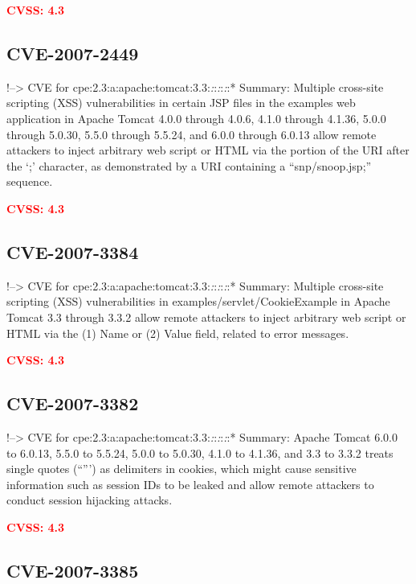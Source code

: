 \documentclass[a4paper, 12pt]{article}
\begin{document}
\textbf{\textcolor{red}{CVSS: 4.3}}

\hypertarget{cve-2007-2449}{%
\subsection{CVE-2007-2449}\label{cve-2007-2449}}

!--\textgreater{} CVE for
cpe:2.3:a:apache:tomcat:3.3:\emph{:}:\emph{:}:\emph{:}:* Summary:
Multiple cross-site scripting (XSS) vulnerabilities in certain JSP files
in the examples web application in Apache Tomcat 4.0.0 through 4.0.6,
4.1.0 through 4.1.36, 5.0.0 through 5.0.30, 5.5.0 through 5.5.24, and
6.0.0 through 6.0.13 allow remote attackers to inject arbitrary web
script or HTML via the portion of the URI after the `;' character, as
demonstrated by a URI containing a ``snp/snoop.jsp;'' sequence.

\textbf{\textcolor{red}{CVSS: 4.3}}

\hypertarget{cve-2007-3384}{%
\subsection{CVE-2007-3384}\label{cve-2007-3384}}

!--\textgreater{} CVE for
cpe:2.3:a:apache:tomcat:3.3:\emph{:}:\emph{:}:\emph{:}:* Summary:
Multiple cross-site scripting (XSS) vulnerabilities in
examples/servlet/CookieExample in Apache Tomcat 3.3 through 3.3.2 allow
remote attackers to inject arbitrary web script or HTML via the (1) Name
or (2) Value field, related to error messages.

\textbf{\textcolor{red}{CVSS: 4.3}}

\hypertarget{cve-2007-3382}{%
\subsection{CVE-2007-3382}\label{cve-2007-3382}}

!--\textgreater{} CVE for
cpe:2.3:a:apache:tomcat:3.3:\emph{:}:\emph{:}:\emph{:}:* Summary: Apache
Tomcat 6.0.0 to 6.0.13, 5.5.0 to 5.5.24, 5.0.0 to 5.0.30, 4.1.0 to
4.1.36, and 3.3 to 3.3.2 treats single quotes (``''') as delimiters in
cookies, which might cause sensitive information such as session IDs to
be leaked and allow remote attackers to conduct session hijacking
attacks.

\textbf{\textcolor{red}{CVSS: 4.3}}

\hypertarget{cve-2007-3385}{%
\subsection{CVE-2007-3385}\label{cve-2007-3385}}
\end{document}
